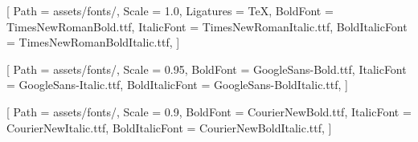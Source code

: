 
\newcommand{\fontdir}{assets/fonts/}


\setmainfont{TimesNewRoman.ttf}[
    Path = \fontdir,
    Scale = 1.0,
    Ligatures = TeX,
    BoldFont = TimesNewRomanBold.ttf,
    ItalicFont = TimesNewRomanItalic.ttf,
    BoldItalicFont = TimesNewRomanBoldItalic.ttf,
]

\setsansfont{GoogleSans-Regular.ttf}[
    Path = \fontdir,
    Scale = 0.95,
    BoldFont = GoogleSans-Bold.ttf,
    ItalicFont = GoogleSans-Italic.ttf,
    BoldItalicFont = GoogleSans-BoldItalic.ttf,
]

\setmonofont{CourierNew.ttf}[
    Path = \fontdir,
    Scale = 0.9,
    BoldFont = CourierNewBold.ttf,
    ItalicFont = CourierNewItalic.ttf,
    BoldItalicFont = CourierNewBoldItalic.ttf,
]

\newcommand{\MySongTi}{NotoSerifSC-Regular.otf}
\newcommand{\MySongTiBold}{NotoSerifSC-Bold.otf}
\newcommand{\MyHeiTi}{NotoSansSC-Regular.otf}
\newcommand{\MyHeiTiBold}{NotoSansSC-Bold.otf}
\newcommand{\MyKaiTi}{STKaiti.ttf}
\newcommand{\MyFangSong}{STFangsong.ttf}

